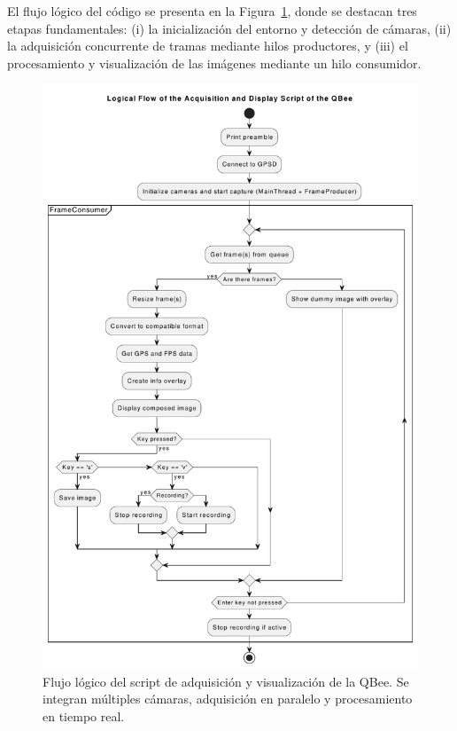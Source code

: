     El flujo lógico del código se presenta en la Figura~\ref{fig:diagrama_script}, donde se destacan tres etapas fundamentales: (i) la inicialización del entorno y detección de cámaras, (ii) la adquisición concurrente de tramas mediante hilos productores, y (iii) el procesamiento y visualización de las imágenes mediante un hilo consumidor.
    
    \begin{figure}[!h]
        \centering
        \includegraphics[trim = 0 0 0 1cm, clip, width=1\textwidth]{Figures/C4/OSU_main.pdf}
        \caption{Flujo lógico del script de adquisición y visualización de la QBee. Se integran múltiples cámaras, adquisición en paralelo y procesamiento en tiempo real.}
        \label{fig:diagrama_script}
    \end{figure}
    
